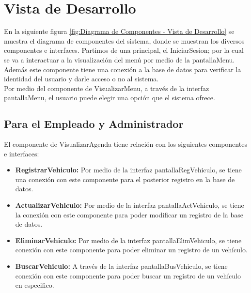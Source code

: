 \section{Vista de Desarrollo}
En la siguiente figura \ref{fig:Diagrama de Componentes - Vista de Desarrollo} se muestra el diagrama de componentes del sistema, donde se muestran los diversos componentes e interfaces. Partimos de una principal, el IniciarSesion; por la cual se va a interactuar a la visualización del menú por medio de la pantallaMenu. Además este componente tiene una conexión a la base de datos para verificar la identidad del usuario y darle acceso o no al sistema. 
\\
Por medio del componente de VisualizarMenu, a través de la interfaz pantallaMenu, el usuario puede elegir una opción que el sistema ofrece.
\subsection{Para el Empleado y Administrador}
El componente de VisualizarAgenda tiene relación con los siguientes componentes e interfaces: 
\begin{itemize}
	\item \textbf{RegistrarVehiculo:} Por medio de la interfaz pantallaRegVehiculo, se tiene una conexión con este componente para el posterior registro en la base de datos.
	\item \textbf{ActualizarVehiculo:} Por medio de la interfaz pantallaActVehiculo, se tiene la conexión con este componente para poder modificar un registro de la base de datos.
	\item \textbf{EliminarVehiculo:} Por medio de la interfaz pantallaElimVehiculo, se tiene conexión con este componente para poder eliminar un registro de un vehículo.
	\item \textbf{BuscarVehiculo:} A través de la interfaz pantallaBusVehiculo, se tiene conexión con este componente para poder buscar un registro de un vehículo en especifico. 
\end{itemize}
